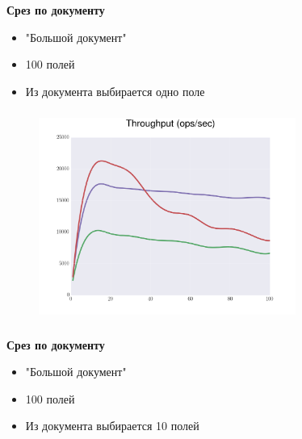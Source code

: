 \documentclass[usenames,dvipsnames, 18pt, compress, aspectratio=169]{beamer}
\begin{document}
\begin{frame}
    \frametitle{}
    \begin{center}
        \textbf{Срез по документу}
        \begin{itemize}[label={}]
            \item "Большой документ"
            \item 100 полей
            \item Из документа выбирается одно поле
        \end{itemize}
    \end{center}
\end{frame}

\begin{frame}
    \frametitle{}
    \begin{center}
    \begin{figure}
        \includegraphics[width=0.75\textwidth,center]{benchmarks/workload_c_select_one/throughput.png}
    \end{figure}
    \end{center}
\end{frame}

\begin{frame}
    \frametitle{}
    \begin{center}
        \textbf{Срез по документу}
        \begin{itemize}[label={}]
            \item "Большой документ"
            \item 100 полей
            \item Из документа выбирается 10 полей
        \end{itemize}
    \end{center}
\end{frame}
\end{document}
